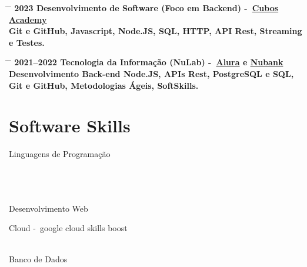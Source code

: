 \documentclass{article}
\begin{document}
\begin{tabbing}
	\hspace{2cm} \= \hspace{4cm} \= \kill
	\bf{2023} \> Desenvolvimento de Software (Foco em Backend) -~\href{https://cubos.academy/}{Cubos Academy} \\
	Git e GitHub, Javascript, Node.JS, SQL, HTTP, API Rest, Streaming e Testes. \\
\end{tabbing}

\begin{tabbing}
	\hspace{2cm} \= \hspace{4cm} \= \kill
	\bf{2021--2022} \> Tecnologia da Informação (NuLab) -~\href{https://www.alura.com.br/}{Alura} e \href{https://nubank.com.br/}{Nubank}\\
	Desenvolvimento Back-end Node.JS, APIs Rest, PostgreSQL e SQL, Git e GitHub, Metodologias Ágeis, SoftSkills. \\
\end{tabbing}

\section*{Software Skills}

\begin{skillgroup}{Linguagens de Programação}%
	\\
	\\
	\\
	\\
\end{skillgroup}

\begin{skillgroup}{Desenvolvimento Web}%
	\\
\end{skillgroup}

\begin{skillgroup}{Cloud}%
	 -\ google cloud skills boost\\
	\\
\end{skillgroup}

\begin{skillgroup}{Banco de Dados}%
	\\
	\\
	\\
	\\
	\\
	\\
\end{skillgroup}
\end{document}
